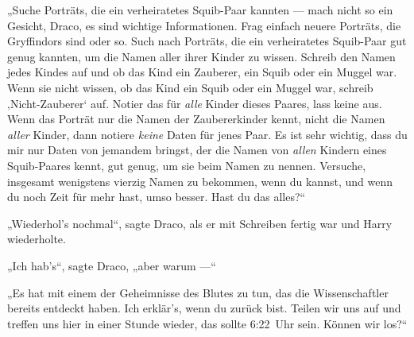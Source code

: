 „Suche Porträts, die ein verheiratetes Squib-Paar kannten — mach nicht so ein Gesicht, Draco, es sind wichtige Informationen. Frag einfach neuere Porträts, die Gryffindors sind oder so. Such nach Porträts, die ein verheiratetes Squib-Paar gut genug kannten, um die Namen aller ihrer Kinder zu wissen. Schreib den Namen jedes Kindes auf und ob das Kind ein Zauberer, ein Squib oder ein Muggel war. Wenn sie nicht wissen, ob das Kind ein Squib oder ein Muggel war, schreib ‚Nicht-Zauberer‘ auf. Notier das für \emph{alle} Kinder dieses Paares, lass keine aus. Wenn das Porträt nur die Namen der Zaubererkinder kennt, nicht die Namen \emph{aller} Kinder, dann notiere \emph{keine} Daten für jenes Paar. Es ist sehr wichtig, dass du mir nur Daten von jemandem bringst, der die Namen von \emph{allen} Kindern eines Squib-Paares kennt, gut genug, um sie beim Namen zu nennen. Versuche, insgesamt wenigstens vierzig Namen zu bekommen, wenn du kannst, und wenn du noch Zeit für mehr hast, umso besser. Hast du das alles?“

„Wiederhol’s nochmal“, sagte Draco, als er mit Schreiben fertig war und Harry wiederholte.

„Ich hab’s“, sagte Draco, „aber warum —“

„Es hat mit einem der Geheimnisse des Blutes zu tun, das die Wissenschaftler bereits entdeckt haben. Ich erklär’s, wenn du zurück bist. Teilen wir uns auf und treffen uns hier in einer Stunde wieder, das sollte 6:22~Uhr sein. Können wir los?“

